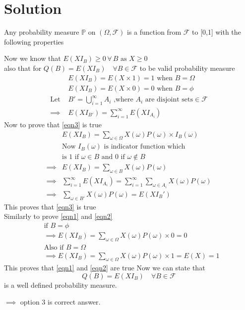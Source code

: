 \documentclass[journal,12pt,twocolumn]{IEEEtran}
\begin{document}
\section{Solution}
Any probability measure \(\mathbb{P}\) on \((\Omega,\mathcal{F})\) is a function from \(\mathcal{F}\) to [0,1] with the following properties
Now we know that \(E(XI_B)\geq 0\, \forall\, B\text{ as } X\geq 0\)\\
also that for \(Q(B) =E(XI_B)\quad  \forall B \in \mathcal{F}\) to be valid probability measure
\begin{align}
& E(XI_B)=E(X\times 1)=1  \text{ when } B=\Omega \label{eqn1}\\ 
& E(XI_B)=E(X\times0)=0  \text{ when } B=\phi  \label{eqn2} \\ \nonumber
 \text{Let } &B'=\bigcup_{i=1}^{\infty} A_i \text{ ,where } A_i\text{ are disjoint sets}\in \mathcal{F}\\ 
\implies & E(XI_{B'})=\sum_{i=1}^{\infty} E(XI_{A_i}) \label{eqn3}
\end{align}
Now to prove that \eqref{eqn3} is true
\begin{align}
& E(XI_B)=\sum_{\omega \in \Omega}{ X(\omega)P(\omega)\times I_B(\omega)}\\ \nonumber
&\text{Now \(I_B(\omega)\) is indicator function which}\\
&\text{is 1 if }\omega \in B \text{ and 0 if } \omega \notin  B\\
\implies & E(XI_B)=\sum_{\omega \in B} {X(\omega)P(\omega)}\\
\implies & \sum_{i=1}^{\infty} E(XI_{A_i})=\sum_{i=1}^{\infty} \sum_{\omega \in A_i}{X(\omega)P(\omega)}\\
\implies & \sum_{\omega \in B'}{X(\omega)P(\omega)}=E(XI_B')
\end{align} 
This proves that \eqref{eqn3} is true\\
Similarly to prove \eqref{eqn1} and \eqref{eqn2}
\begin{align} \nonumber
&\text{if }B =\phi \\
&\implies E(XI_B)=\sum_{\omega \in \Omega}{ X(\omega)P(\omega)\times 0}=0\\ \nonumber
&\text{Also if }B=\Omega\\
&\implies E(XI_B)=\sum_{\omega \in \Omega}{ X(\omega) P(\omega)\times 1}=E(X)=1
\end{align}
This proves that \eqref{eqn1} and \eqref{eqn2} are true 
Now we can state that \[Q(B)=E(XI_B)\quad\forall B \in \mathcal{F}\] is a well defined probability measure.

\(\implies\) option 3 is correct answer.
\end{document}
